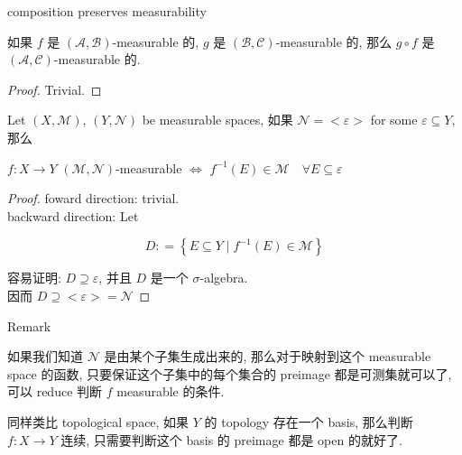\documentclass{qlnotes-export}
\begin{document}
\begin{proposition}{composition preserves measurability}\label{prop-04-measurable-functions-and-integration-on-l-mu-composition-preserves-measurability}

如果 \(f\) 是 \((\mathcal{A},\mathcal{B})\)-measurable 的, \(g\) 是 \((\mathcal{B},\mathcal{C})\)-measurable 的, 那么 \(g \circ f\) 是 \((\mathcal{A},\mathcal{C})\)-measurable 的.

\end{proposition}

\begin{proof}

Trivial.

\end{proof}

\begin{lemma}\label{lem-04-measurable-functions-and-integration-on-l-mu-lemma-001}

Let \((X,\mathcal{M})\), \((Y,\mathcal{N})\) be measurable spaces, 如果 \(\mathcal{N} = < \varepsilon >\) for some \(\varepsilon \subseteq Y\), 那么

\(f:X\rightarrow Y\) \((\mathcal{M},\mathcal{N})\)-measurable \(\Leftrightarrow\) \(f^{- 1}(E) \in \mathcal{M}\quad\forall E \subseteq \varepsilon\)

\end{lemma}

\begin{proof}

foward direction: trivial.\\
backward direction: Let

\[D: = \left\{ {E \subseteq Y \mid f^{- 1}(E) \in \mathcal{M}} \right\}\]

容易证明: \(D \supseteq \varepsilon\), 并且 \(D\) 是一个 \(\sigma\)-algebra.\\
因而 \(D \supseteq < \varepsilon > = \mathcal{N}\)

\end{proof}

\begin{qlremark}{Remark}

如果我们知道 \(\mathcal{N}\) 是由某个子集生成出来的, 那么对于映射到这个 measurable space 的函数, 只要保证这个子集中的每个集合的 preimage 都是可测集就可以了, 可以 reduce 判断 \(f\) measurable 的条件.

同样类比 topological space, 如果 \(Y\) 的 topology 存在一个 basis, 那么判断 \(f:X\rightarrow Y\) 连续, 只需要判断这个 basis 的 preimage 都是 open 的就好了.

\end{qlremark}
\end{document}
